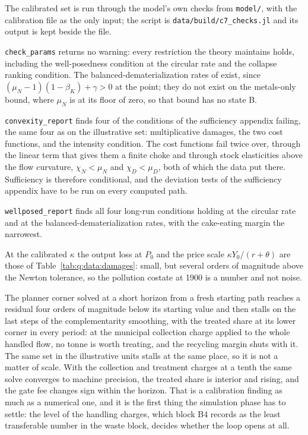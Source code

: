 The calibrated set is run through the model's own checks from \texttt{model/}, with the calibration file as the only input; the script is \texttt{data/build/c7\_checks.jl} and its output is kept beside the file.

 \texttt{check\_params} returns no warning: every restriction the theory maintains holds, including the well-posedness condition at the circular rate and the collapse ranking condition. The balanced-dematerialization rates of  exist, since $\left(\mu_N-1\right)\left(1-\beta_K\right)+\gamma>0$ at the point; they do not exist on the metals-only bound, where $\mu_N$ is at its floor of zero, so that bound has no state B.

 \texttt{convexity\_report} finds four of the conditions of the sufficiency appendix failing, the same four as on the illustrative set: multiplicative damages, the two cost functions, and the intensity condition. The cost functions fail twice over, through the linear term that gives them a finite choke and through stock elasticities above the flow curvature, $\chi_N<\mu_N$ and $\chi_D<\mu_D$, both of which the data put there. Sufficiency is therefore conditional, and the deviation tests of the sufficiency appendix have to be run on every computed path.

 \texttt{wellposed\_report} finds all four long-run conditions holding at the circular rate and at the balanced-dematerialization rates, with the cake-eating margin the narrowest.

 At the calibrated $\kappa$ the output loss at $P_0$ and the price scale $\kappa Y_0/\left(r+\theta\right)$ are those of Table~\ref{tab:q:data:damages}: small, but several orders of magnitude above the Newton tolerance, so the pollution costate at 1900 is a number and not noise.

 The planner corner solved at a short horizon from a fresh starting path reaches a residual four orders of magnitude below its starting value and then stalls on the last steps of the complementarity smoothing, with the treated share at its lower corner in every period: at the municipal collection charge applied to the whole handled flow, no tonne is worth treating, and the recycling margin shuts with it. The same set in the illustrative units stalls at the same place, so it is not a matter of scale. With the collection and treatment charges at a tenth the same solve converges to machine precision, the treated share is interior and rising, and the gate fee changes sign within the horizon. That is a calibration finding as much as a numerical one, and it is the first thing the simulation phase has to settle: the level of the handling charges, which block B4 records as the least transferable number in the waste block, decides whether the loop opens at all.
